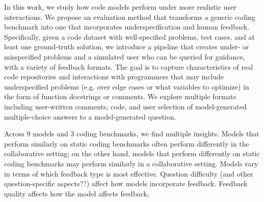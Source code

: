 In this work, we study how code models perform under more realistic user interactions.
We propose an evaluation method that transforms a generic coding benchmark into one that incorporates underspecification and human feedback. 
Specifically, given a code dataset with well-specified problems, test cases, and at least one ground-truth solution, we introduce a pipeline that creates under- or misspecified problems and a simulated user who can be queried for guidance, with a variety of feedback formats.
The goal is to capture characteristics of real code repositories and interactions with programmers that may include underspecified problems (e.g. over edge cases or what variables to optimize) in the form of function docstrings or comments.
We explore multiple formats including user-written comments, code, and user selection of model-generated multiple-choice answers to a model-generated question.


Across 9 models and 3 coding benchmarks, we find multiple insights.
 Models that perform similarly on static coding benchmarks often perform differently in the collaborative setting; on the other hand, models that perform differently on static coding benchmarks may perform similarly in a collaborative setting.
Models vary in terms of which feedback type is most effective.
Question difficulty (and other question-specific aspects??) affect how models incorporate feedback.
Feedback quality affects how the model affects feedback.





